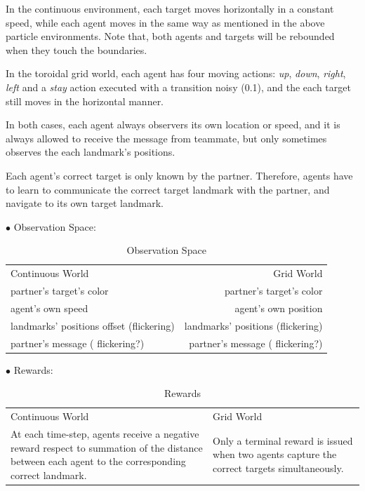 \documentclass{article}
\begin{document}
In the continuous environment, each target moves horizontally in a constant speed, while each agent moves in the same way as mentioned in the above particle environments. Note that, both agents and targets will be rebounded when they touch the boundaries. 

In the toroidal grid world, each agent has four moving actions: \emph{up}, \emph{down}, \emph{right}, \emph{left} and a \emph{stay} action executed with a transition noisy (0.1), and the each target still moves in the horizontal manner. 

In both cases, each agent always observers its own location or speed, and it is always allowed to receive the message from teammate, but only sometimes observes the each landmark's positions. 

Each agent's correct target is only known by the partner. Therefore, agents have to learn to communicate the correct target landmark with the partner, and navigate to its own target landmark. 

$\bullet$ Observation Space:

\begin{table}[h]
    \caption {Observation Space}
    \label{obs space}
    \centering
    \begin{tabular}{l|r}
    \toprule
        Continuous World & Grid World \\
        \cmidrule(lr){1-2}
        partner's target's color & partner's target's color\\
        agent's own speed & agent's own position\\
        landmarks' positions offset (flickering) & landmarks' positions (flickering)\\
        partner's message ({\color{red} flickering?}) & partner's message ({\color{red} flickering?})\\
    \bottomrule
    \end{tabular} 
\end{table}

$\bullet$ Rewards:

\begin{table}[h]
    \caption {Rewards}
    \label{obs space}
    \centering
    \begin{tabular}{p{4cm}|p{3cm}}
    \toprule
        Continuous World & Grid World \\
        \cmidrule(lr){1-2}
        At each time-step, agents receive a negative reward respect to summation of the distance between each agent to the corresponding correct landmark.
& Only a terminal reward is issued when two agents capture the correct targets simultaneously.\\
    \bottomrule
    \end{tabular} 
\end{table}
\end{document}
